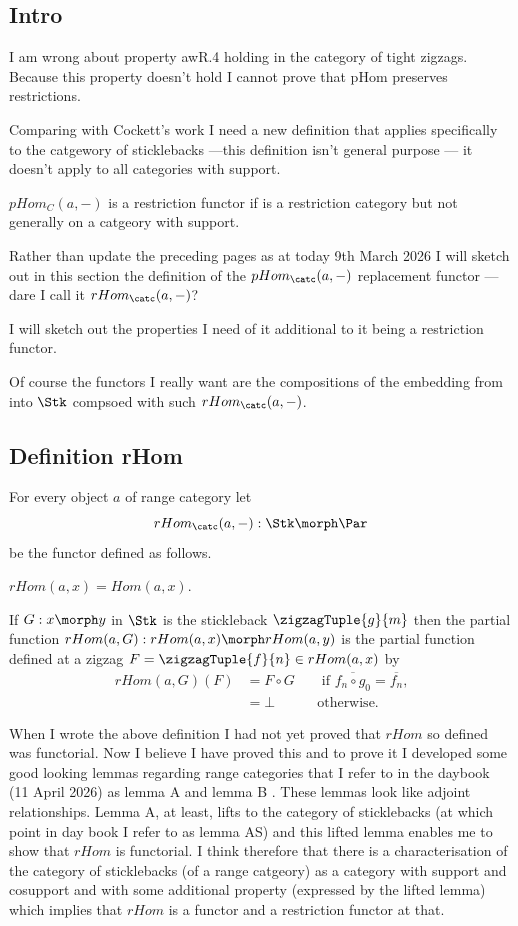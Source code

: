
\subsection{Intro}
I am wrong about property awR.4 holding in the category of tight zigzags. Because this property doesn't hold I cannot prove that pHom preserves restrictions. 

Comparing with Cockett's work I need a new definition that applies specifically to the catgewory of sticklebacks ---this definition isn't general purpose --- it doesn't apply to all categories with support.

$pHom_C(a,-)$ is a restriction functor if \catcw is a restriction category but not generally on a catgeory with support.     

Rather than update the preceding pages as at today 9th March 2026 I will 
sketch out  in this section the definition of the $pHom_\catc(a,-)$ replacement functor --- dare I call it $rHom_\catc(a,-)$? 

I will sketch out the properties I need of it additional to it being a
restriction functor. 

Of course the functors I really want are the compositions
of the embedding from \catcw into $\Stk$ compsoed with
such $rHom_\catc(a,-)$.
\subsection{Definition rHom}
For every object $a$ of range category \catcw let
\[
rHom_\catc(a,-): \Stk \morph \Par
\]
be the  functor
defined as follows. 

$rHom(a,x)=Hom(a,x)$.


If $G: x \morph y$ in $\Stk$ is the stickleback
$\zigzagTuple{g}{m}$ then the partial function
$rHom(a,G): rHom(a,x) \morph rHom(a,y)$
is the partial function defined at a zigzag 
$F=\zigzagTuple{f}{n}\in rHom(a,x)$ by
\begin{align*}
rHom(a,G)(F) &= F \circ G  &&\mbox{ if $\overline{f_n \circ g_0} = \overline{f_n}$,} \\
             &=\bot        && \mbox{otherwise.}
\end{align*}

\begin{aside}
When I wrote the above definition I had not yet proved that $rHom$ so defined was functorial. Now I believe I have proved this and to prove it I developed some good looking lemmas regarding range categories that I refer to in the daybook (11 April 2026) as lemma A and lemma B
. These lemmas look like adjoint relationships. Lemma A, at least, lifts to the category of sticklebacks (at which point in day book I refer to as lemma AS) and this lifted lemma enables me to show that $rHom$ is functorial. I think therefore that there is a characterisation of the category of sticklebacks (of a range catgeory) as a category with support and cosupport and with some additional
property (expressed by the lifted lemma) which implies that $rHom$ is a functor and a restriction functor at that.
\end{aside}

